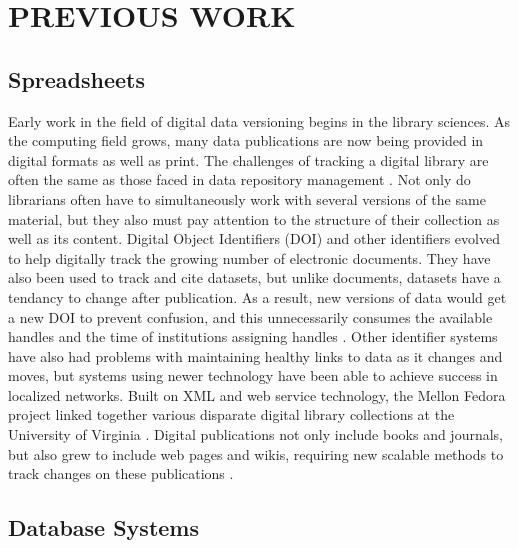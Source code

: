
\chapter{PREVIOUS WORK}
\section{Spreadsheets}
Early work in the field of digital data versioning begins in the library sciences.
As the computing field grows, many data publications are now being provided in digital formats as well as print.
The challenges of tracking a digital library are often the same as those faced in data repository management \cite{Wiil:2000:RDH:338407.338517}.
Not only do librarians often have to simultaneously work with several versions of the same material, but they also must pay attention to the structure of their collection as well as its content.
Digital Object Identifiers (DOI) and other identifiers evolved to help digitally track the growing number of electronic documents.
They have also been used to track and cite datasets, but unlike documents, datasets have a tendancy to change after publication.
As a result, new versions of data would get a new DOI to prevent confusion, and this unnecessarily consumes the available handles and the time of institutions assigning handles \cite{Lyons2005}.
Other identifier systems have also had problems with maintaining healthy links to data as it changes and moves, but systems using newer technology have been able to achieve success in localized networks.
Built on XML and web service technology, the Mellon Fedora project linked together various disparate digital library collections at the University of Virginia  \cite{Payette2002}.
Digital publications not only include books and journals, but also grew to include web pages and wikis, requiring new scalable methods to track changes on these publications \cite{Berberich:2007:TMT:1277741.1277831}.

\section{Database Systems}
